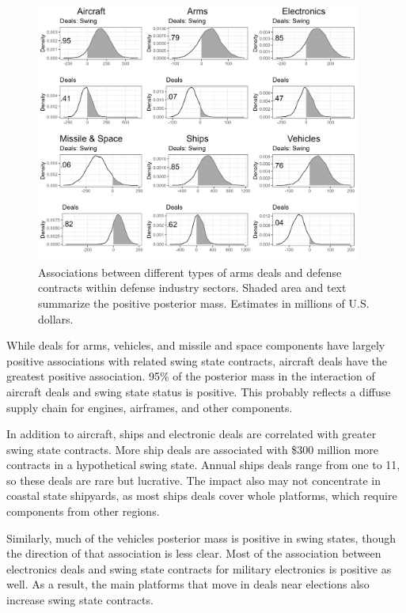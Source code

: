 \documentclass[12pt]{article}
\begin{document}
\begin{figure}[htpb]
	\centering
		\includegraphics[width=0.95\textwidth]{../figures/me-deals-sector.png}
	\caption{Associations between different types of arms deals and defense contracts within defense industry sectors. Shaded area and text summarize the positive posterior mass. Estimates in millions of U.S. dollars.}
	\label{fig:me-deals-sector}
\end{figure}


While deals for arms, vehicles, and missile and space components have largely positive associations with related swing state contracts, aircraft deals have the greatest positive association. 
95\% of the posterior mass in the interaction of aircraft deals and swing state status is positive.
This probably reflects a diffuse supply chain for engines, airframes, and other components. 


In addition to aircraft, ships and electronic deals are correlated with greater swing state contracts. 
More ship deals are associated with \$300 million more contracts in a hypothetical swing state. 
Annual ships deals range from one to 11, so these deals are rare but lucrative. 
The impact also may not concentrate in coastal state shipyards, as most ships deals cover whole platforms, which require components from other regions. 


Similarly, much of the vehicles posterior mass is positive in swing states, though the direction of that association is less clear.
Most of the association between electronics deals and swing state contracts for military electronics is positive as well.
As a result, the main platforms that move in deals near elections also increase swing state contracts. 
\end{document}
